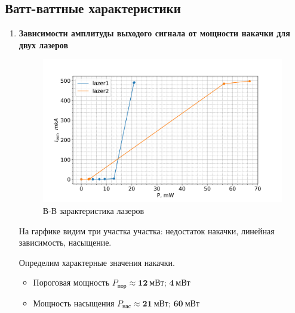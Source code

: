 \documentclass[a4paper]{article}
\begin{document}
	\subsection{Ватт-ваттные характеристики}
	
        \begin{enumerate}
                
            \item \textbf{Зависимости амплитуды выходого сигнала от мощности накачки для двух лазеров} \par
            
                \begin{figure}[H]
                    \begin{center}
                        \includegraphics[scale=0.5]{WW-laser.png}
                        \caption{В-В зарактеристика лазеров}
                        \label{W-W-lasers}
                    \end{center}
                \end{figure}
                
                \par На гарфике видим три участка участка: недостаток накачки, линейная зависимость, насыщение. \par 
                Определим характерные значения накачки.

                \begin{itemize}
                    \item Пороговая мощность $P_{\mbox{пор}} \approx \textbf{12}\: \mbox{мВт}$; $\textbf{4}\: \mbox{мВт}$
                    \item Мощность насыщения $P_{\mbox{нас}} \approx \textbf{21} \:  \mbox{мВт}$; $\textbf{60} \:  \mbox{мВт}$
                \end{itemize}
        

\end{enumerate}
\end{document}
